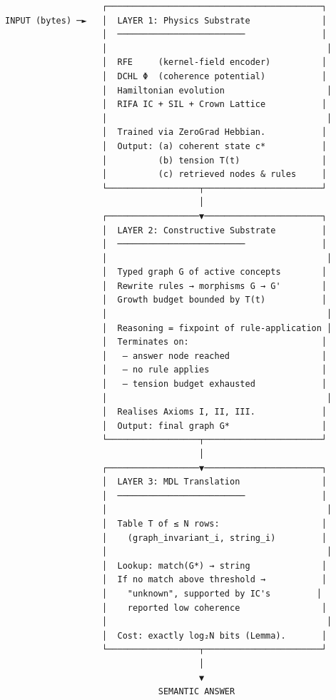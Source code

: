 \documentclass[
  11pt,
  a4paper,
]{article}
\begin{document}
\begin{verbatim}
                   ┌──────────────────────────────────────────┐
INPUT (bytes) ─►   │  LAYER 1: Physics Substrate              │
                   │  ─────────────────────────               │
                   │                                           │
                   │  RFE     (kernel-field encoder)          │
                   │  DCHL Φ  (coherence potential)           │
                   │  Hamiltonian evolution                    │
                   │  RIFA IC + SIL + Crown Lattice           │
                   │                                           │
                   │  Trained via ZeroGrad Hebbian.           │
                   │  Output: (a) coherent state c*           │
                   │          (b) tension T(t)                │
                   │          (c) retrieved nodes & rules     │
                   └──────────────────┬───────────────────────┘
                                      │
                   ┌──────────────────▼───────────────────────┐
                   │  LAYER 2: Constructive Substrate         │
                   │  ─────────────────────────               │
                   │                                           │
                   │  Typed graph G of active concepts        │
                   │  Rewrite rules → morphisms G → G'        │
                   │  Growth budget bounded by T(t)           │
                   │                                           │
                   │  Reasoning = fixpoint of rule-application │
                   │  Terminates on:                          │
                   │   – answer node reached                  │
                   │   – no rule applies                      │
                   │   – tension budget exhausted             │
                   │                                           │
                   │  Realises Axioms I, II, III.             │
                   │  Output: final graph G*                  │
                   └──────────────────┬───────────────────────┘
                                      │
                   ┌──────────────────▼───────────────────────┐
                   │  LAYER 3: MDL Translation                │
                   │  ─────────────────────────               │
                   │                                           │
                   │  Table T of ≤ N rows:                    │
                   │    (graph_invariant_i, string_i)         │
                   │                                           │
                   │  Lookup: match(G*) → string              │
                   │  If no match above threshold →           │
                   │    "unknown", supported by IC's         │
                   │    reported low coherence                │
                   │                                           │
                   │  Cost: exactly log₂N bits (Lemma).       │
                   └──────────────────┬───────────────────────┘
                                      │
                                      ▼
                              SEMANTIC ANSWER
\end{verbatim}
\end{document}
